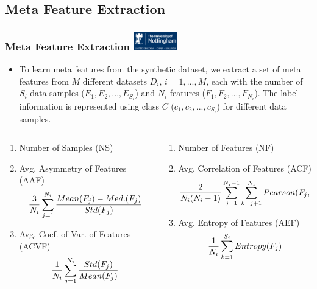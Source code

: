 \documentclass[aspectratio=1610]{beamer}
\newcommand{\UoN}
  {\hfill {\includegraphics[height=0.8cm]{nott_logo/nott_logo_white.png}}}
\begin{document}
\subsection{Meta Feature Extraction}
\begin{frame}
\frametitle{Meta Feature Extraction \UoN}
	\begin{itemize}
		\item To learn meta features from the synthetic dataset, we extract a set of meta features from $M$ different datasets $D_i$, $i=1,..., M$, each with the number of $S_i$ data samples ($E_1, E_2,..., E_{S_i}$) and $N_i$ features ($F_1, F_2,..., F_{N_i}$). The label information is represented using class $C$ ($c_1, c_2,..., c_{S_i}$) for different data samples.
	\end{itemize}
	
	
	\begin{columns}
		\begin{column}{0.5\textwidth}
			\begin{enumerate}
				\item[1.] Number of Samples (NS)
				\item[3.] Avg. Asymmetry of Features (AAF)
				\begin{equation}\footnotesize %
					\frac{3}{N_i} \sum^{N_i}_{j=1} \frac{Mean(F_j) - Med.(F_j)}{Std(F_j)}
				\end{equation}
				\item[5.] Avg. Coef. of Var. of Features (ACVF)
				\begin{equation}\footnotesize
				\frac{1}{N_i} \sum^{N_i}_{j=1} \frac{Std(F_j)}{Mean(F_j)}
				\end{equation}
			\end{enumerate}
		\end{column}
		
		\begin{column}{0.5\textwidth}
			\begin{enumerate}
				\item[2.] Number of Features (NF)
				\item[4.] Avg. Correlation of Features (ACF)
				\begin{equation}\footnotesize %
				\frac{2}{N_i(N_i-1)} \sum^{N_i-1}_{j=1} \sum^{N_i}_{k=j+1} Pearson(F_j, F_k)
				\end{equation}
				\item[6.] Avg. Entropy of Features (AEF)
				\begin{equation}\footnotesize
				\frac{1}{N_i} \sum^{S_i}_{k=1}Entropy(F_j)
				\end{equation}
			\end{enumerate}
		\end{column}
	\end{columns}
\end{frame}
\end{document}
